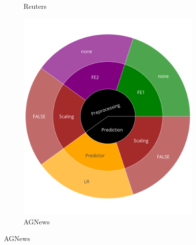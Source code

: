 \begin{figure}
\begin{subfigure}[t]{0.3\textwidth}
    \caption{Reuters}
  	\end{subfigure}
	\begin{subfigure}[t]{0.3\textwidth}
    \centering\includegraphics[width=\textwidth]{img/sunburst/agnews.png}
    \caption{AGNews}
  	\end{subfigure}


\end{figure}
